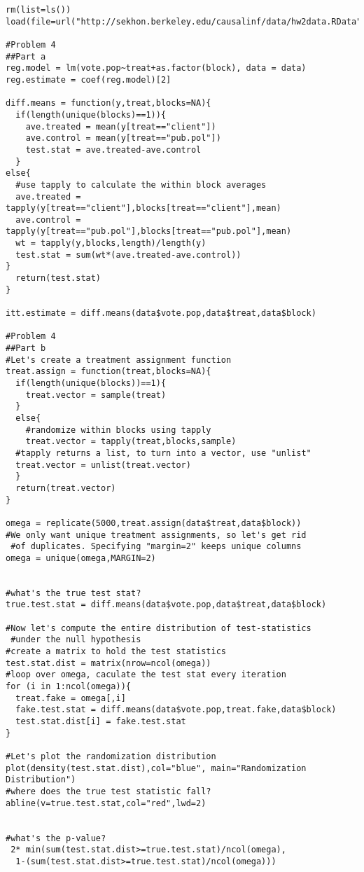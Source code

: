 \documentclass{article}
\begin{document}
\begin{verbatim}
rm(list=ls())
load(file=url("http://sekhon.berkeley.edu/causalinf/data/hw2data.RData"))

#Problem 4
##Part a
reg.model = lm(vote.pop~treat+as.factor(block), data = data)
reg.estimate = coef(reg.model)[2]

diff.means = function(y,treat,blocks=NA){
  if(length(unique(blocks)==1)){
    ave.treated = mean(y[treat=="client"])
    ave.control = mean(y[treat=="pub.pol"])
    test.stat = ave.treated-ave.control
  }
else{
  #use tapply to calculate the within block averages
  ave.treated = tapply(y[treat=="client"],blocks[treat=="client"],mean)
  ave.control = tapply(y[treat=="pub.pol"],blocks[treat=="pub.pol"],mean)
  wt = tapply(y,blocks,length)/length(y)
  test.stat = sum(wt*(ave.treated-ave.control))
}
  return(test.stat)
}

itt.estimate = diff.means(data$vote.pop,data$treat,data$block)

#Problem 4
##Part b
#Let's create a treatment assignment function
treat.assign = function(treat,blocks=NA){
  if(length(unique(blocks))==1){
    treat.vector = sample(treat)
  }
  else{
    #randomize within blocks using tapply
    treat.vector = tapply(treat,blocks,sample)
  #tapply returns a list, to turn into a vector, use "unlist"
  treat.vector = unlist(treat.vector)
  }
  return(treat.vector)
}

omega = replicate(5000,treat.assign(data$treat,data$block))
#We only want unique treatment assignments, so let's get rid 
 #of duplicates. Specifying "margin=2" keeps unique columns
omega = unique(omega,MARGIN=2)


#what's the true test stat?
true.test.stat = diff.means(data$vote.pop,data$treat,data$block)

#Now let's compute the entire distribution of test-statistics 
 #under the null hypothesis
#create a matrix to hold the test statistics
test.stat.dist = matrix(nrow=ncol(omega))
#loop over omega, caculate the test stat every iteration
for (i in 1:ncol(omega)){
  treat.fake = omega[,i]
  fake.test.stat = diff.means(data$vote.pop,treat.fake,data$block)
  test.stat.dist[i] = fake.test.stat
}

#Let's plot the randomization distribution
plot(density(test.stat.dist),col="blue", main="Randomization Distribution")
#where does the true test statistic fall?
abline(v=true.test.stat,col="red",lwd=2)


#what's the p-value?
 2* min(sum(test.stat.dist>=true.test.stat)/ncol(omega),
  1-(sum(test.stat.dist>=true.test.stat)/ncol(omega)))


\end{verbatim}
\end{document}
